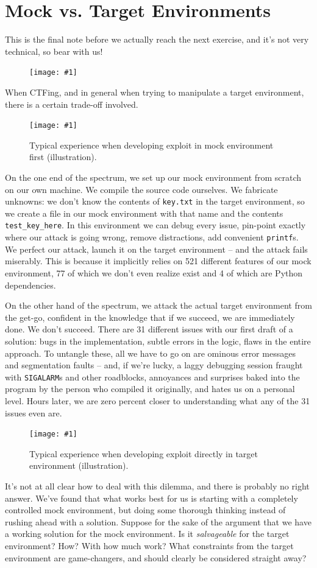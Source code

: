 \documentclass{article}
\newcommand{\displayimage}[1] {
\begin{figure}[H]
    \centering
    \texttt{[image: \#1]} 
\end{figure}
}
\newcommand{\wrapimagerightcap}[2] {
    \begin{figure}\begin{center}\texttt{[image: \#1]}\end{center}\caption{#2}\end{figure}}
\newcommand{\wrapimageleftcap}[2] {\begin{figure}\begin{center}\texttt{[image: \#1]}\end{center}\caption{#2}\end{figure}
}
\newcommand{\xcode}[2]{\colorbox{ubuntuback}{\lstinline[language=#1]|#2|}}
\newcommand{\code}[1]{\colorbox{ubuntuback}{\texttt{#1}}}
\begin{document}
\section{Mock vs. Target Environments}

This is the final note before we actually reach the next exercise, and it's not very technical, so bear with us!

\displayimage{./images/bearwithme.png}

When CTFing, and in general when trying to manipulate a target environment, there is a certain trade-off involved. 

\wrapimagerightcap{./images/expectation_vs_reality.jpg}{Typical experience when developing exploit in mock environment first (illustration).}
On the one end of the spectrum, we set up our mock environment from scratch on our own machine. We compile the source code ourselves. We fabricate unknowns: we don't know the contents of \code{key.txt} in the target environment, so we create a file in our mock environment with that name and the contents \code{test\_key\_here}. In this environment we can debug every issue, pin-point exactly where our attack is going wrong, remove distractions, add convenient \xcode{C}{printf}s. We perfect our attack, launch it on the target environment -- and the attack fails miserably. This is because it implicitly relies on 521 different features of our mock environment, 77 of which we don't even realize exist and 4 of which are Python dependencies.

On the other hand of the spectrum, we attack the actual target environment from the get-go, confident in the knowledge that if we succeed, we are immediately done. We don't succeed. There are 31 different issues with our first draft of a solution: bugs in the implementation, subtle errors in the logic, flaws in the entire approach. To untangle these, all we have to go on are ominous error messages and segmentation faults -- and, if we're lucky, a laggy debugging session fraught with \code{SIGALARM}s and other roadblocks, annoyances and surprises baked into the program by the person who compiled it originally, and hates us on a personal level. Hours later, we are zero percent closer to understanding what any of the 31 issues even are.

\wrapimageleftcap{./images/target_environment.png}{Typical experience when developing exploit directly in target environment (illustration).}
It's not at all clear how to deal with this dilemma, and there is probably no right answer. We've found that what works best for us is starting with a completely controlled mock environment, but doing some thorough thinking instead of rushing ahead with a solution. Suppose for the sake of the argument that we have a working solution for the mock environment. Is it \textit{salvageable} for the target environment? How? With how much work? What constraints from the target environment are game-changers, and should clearly be considered straight away?
\end{document}
